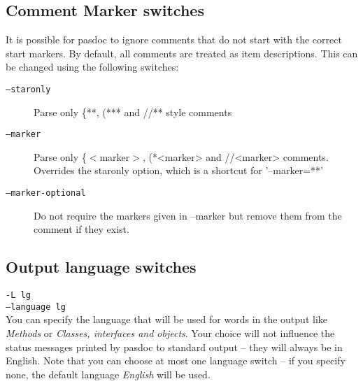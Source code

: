 \documentclass[11pt]{article}
\begin{document}
\subsection{Comment Marker switches}
\label{specifymarkers}

It is possible for pasdoc to ignore comments that do not
start with the correct start markers. By default, all
comments are treated as item descriptions. This can
be changed using the following switches:

\begin{description}
\item[{\tt --staronly}] Parse only \{**, (*** and //** style comments
\item[{\tt --marker}] Parse only \{$<$marker$>$, (*<marker> and //<marker> 
comments. Overrides the staronly option, which is a shortcut for 
'--marker=**'
\item[{\tt --marker-optional}] Do not require the markers given in --marker but 
remove them from the comment if they exist.
\end{description}

\subsection{Output language switches}

{\tt -L lg}\\
{\tt --language lg}\\


You can specify the language that will be used for words in the output like
\emph{Methods} or \emph{Classes, interfaces and objects}.
Your choice will not influence the status messages printed by pasdoc to
standard output -- they will always be in English.
Note that you can choose at most one language switch -- if you specify none,
the default language \emph{English} will be used.
\end{document}
